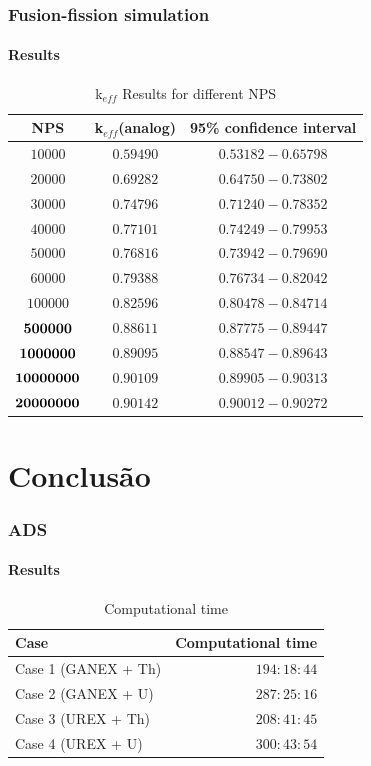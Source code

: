 \documentclass[svgnames,smaller,table]{beamer}
\begin{document}



\begin{frame}
  \frametitle{Fusion-fission simulation}
  \framesubtitle{Results}
  

\begin{table}[htb!]
\caption{k$_{eff}$ Results for different NPS}
\label{NPS}
\centering
\vspace{0.5cm}
\begin{tabular}{c|c|c}\hline
NPS & k$_{eff}$(analog) & 95\% confidence interval\\ \hline
$10000$ & $0.59490$ & $0.53182-0.65798$\\ \hline
$20000$ & $0.69282$ & $0.64750-0.73802$\\ \hline
$30000$ & $0.74796$ & $0.71240-0.78352$\\ \hline
$40000$ & $0.77101$ & $0.74249-0.79953$\\ \hline
$50000$ & $0.76816$ & $0.73942-0.79690$\\ \hline
$60000$ & $0.79388$ & $0.76734-0.82042$\\ \hline
$100000$ & $0.82596$ & $0.80478-0.84714$\\ \hline
${\bf 500000}$ & $0.88611$ & $0.87775-0.89447$\\ \hline
${\bf 1000000}$ & $0.89095$ & $0.88547-0.89643$\\ \hline
${\bf 10000000}$ & $0.90109$ & $0.89905-0.90313$\\ \hline
${\bf 20000000}$ & $0.90142$ & $0.90012-0.90272$\\ \hline
\end{tabular}
\end{table}
\end{frame}

\section{Conclusão}
\begin{frame}
  \frametitle{ADS}
  \framesubtitle{Results}
  \begin{table}%
    \caption{Computational time}
    \label{time}
    \centering
    \vspace{0.5cm}
    \begin{tabular}{l|r}\hline   
      Case & Computational time\\ \hline
      Case 1 (GANEX + Th) & $194:18:44 $\\ \hline
      Case 2 (GANEX + U) & $287:25:16 $\\ \hline
      Case 3 (UREX + Th) & $208:41:45 $\\ \hline
      Case 4 (UREX + U) & $300:43:54 $\\ \hline
    \end{tabular}
  \end{table}
  
\end{frame}
\end{document}
